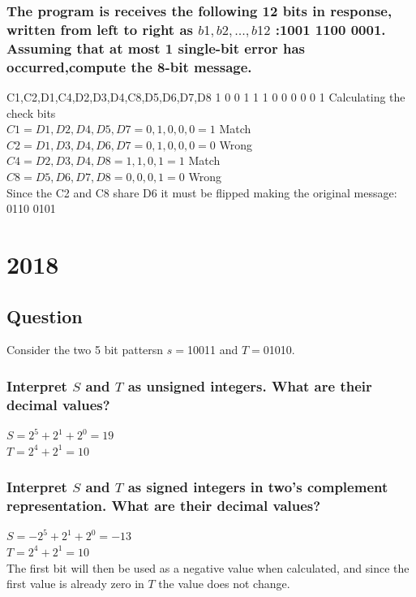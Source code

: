 \documentclass[12pt, a4paper]{article}
\begin{document}
			\subsubsection{The program is receives the following 12 bits in response, written from left to right as $b1,b2,. . ., b12$ :1001 1100 0001. Assuming that at most 1 single-bit error has occurred,compute the 8-bit message.}
				C1,C2,D1,C4,D2,D3,D4,C8,D5,D6,D7,D8
				1   0   0   1   1    1   0   0   0   0   0   1
				Calculating the check bits\\
				$C1=D1,D2,D4,D5,D7=0,1,0,0,0=1$ Match\\
				$C2=D1,D3,D4,D6,D7=0,1,0,0,0=0$ Wrong\\
				$C4=D2,D3,D4,D8=1,1,0,1=1$ Match\\
				$C8=D5,D6,D7,D8=0,0,0,1=0$ Wrong\\
				Since the C2 and C8 share D6 it must be flipped making the original message:\\
				0110 0101 
	\section{2018}
		\subsection{Question}
			Consider the two 5 bit pattersn $s=$10011 and $T=$01010.
			\subsubsection{ Interpret $S$ and $T$ as unsigned integers. What are their decimal values?}
				$S=2^5+2^1+2^0=19$\\
				$T=2^4+2^1=10$\\
			\subsubsection{Interpret $S$ and $T$ as signed integers in two’s complement representation. What are their decimal values?}
				$S=-2^5+2^1+2^0=-13$\\
				$T=2^4+2^1=10$\\
				The first bit will then be used as a negative value when calculated, and since the first value is already zero in $T$ the value does not change.
\end{document}
